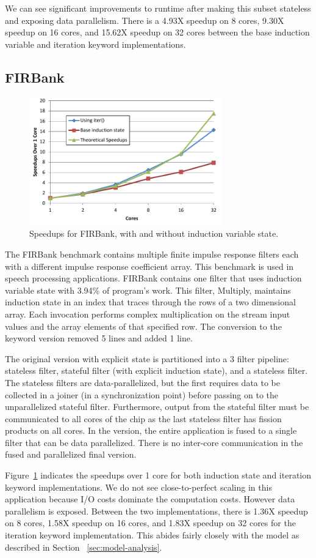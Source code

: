 We can see significant improvements to runtime after making this subset stateless and exposing data parallelism.  There is a 4.93X speedup on 8 cores, 9.30X speedup on 16 cores, and 15.62X speedup on 32 cores between the base induction variable and iteration keyword implementations.  

\subsection{FIRBank}
\begin{figure}[t]
\includegraphics[width=3.3in]{figures/firbank-results.pdf}
\caption{Speedups for FIRBank, with and without induction variable state.  \protect\label{fig:firbank-results}}
\end{figure}

The FIRBank benchmark contains multiple finite impulse response
filters each with a different impulse response coefficient array. This
benchmark is used in speech processing applications. FIRBank contains
one filter that uses induction variable state with 3.94\% of program's
work. This filter, Multiply, maintains induction state in an index
that traces through the rows of a two dimensional array. Each
invocation performs complex multiplication on the stream input values
and the array elements of that specified row.  The conversion to the
\iter keyword version removed 5 lines and added 1 line.

The original version with explicit state is partitioned into a 3
filter pipeline: stateless filter, stateful filter (with explicit
induction state), and a stateless filter. The stateless filters are
data-parallelized, but the first requires data to be collected in a
joiner (in a synchronization point) before passing on to the
unparallelized stateful filter. Furthermore, output from the stateful
filter must be communicated to all cores of the chip as the last
stateless filter has fission products on all cores.  In the \iter
version, the entire application is fused to a single filter that can
be data parallelized.  There is no inter-core communication in the
fused and parallelized final version.

Figure~\ref{fig:firbank-results} indicates the speedups over 1 core
for both induction state and iteration keyword implementations.
We do not see close-to-perfect scaling in this application because
I/O costs dominate the computation costs.  However data parallelism
is exposed.  Between the two implementations, there is 1.36X speedup on 8 cores,
1.58X speedup on 16 cores, and 1.83X speedup on 32 cores for the
iteration keyword implementation. This abides fairly closely with the
model as described in Section ~\ref{sec:model-analysis}.
